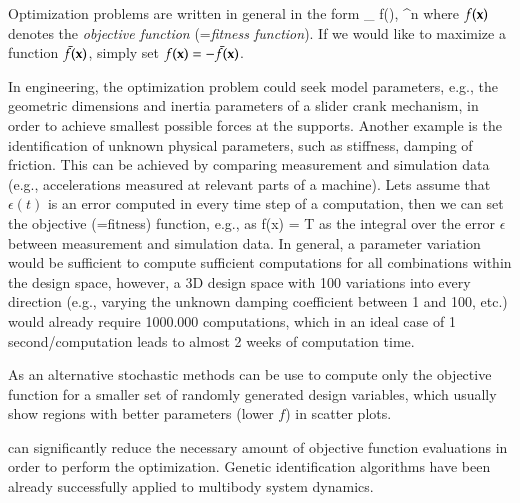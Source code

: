 Optimization problems are written in general in the form
\be
  \min\limits_{\xv} f(\xv), \quad \xv \in \Rcal^n \eqComma
\ee
where $f(\mathbf{x})$ denotes the {\it objective function} (={\it fitness function}). If we would like to maximize a function $\bar f(\mathbf{x})$, simply set $f(\mathbf{x})=-\bar f(\mathbf{x})$.

In engineering, the optimization problem could seek model parameters, e.g., the geometric dimensions and inertia parameters of a slider crank mechanism, in order to achieve smallest possible forces at the supports.
Another example is the identification of unknown physical parameters, such as stiffness, damping of friction. This can be achieved by comparing measurement and simulation data (e.g., accelerations measured at relevant parts of a machine). Lets assume that $\epsilon(t)$ is an error computed in every time step of a computation, then we can set the objective (=fitness) function, e.g., as 
\be
  f(x) =  T 
\ee
as the integral over the error $\epsilon$ between measurement and simulation data.
In general, a parameter variation would be sufficient to compute sufficient computations for all combinations within the design space, however, a 3D design space with 100 variations into every direction (e.g., varying the unknown damping coefficient between 1 and 100, etc.) would already require 1000.000 computations, which in an ideal case of 1 second/computation leads to almost 2 weeks of computation time.

As an alternative stochastic methods can be use to compute only the objective function for a smaller set of randomly generated design variables, which usually show regions with better parameters (lower $f$) in scatter plots.

\cite{Goldberg1989, Whitley1994} can significantly reduce the necessary amount of objective function evaluations in order to perform the optimization. Genetic identification algorithms have been already successfully applied to multibody system dynamics\cite{Eder2014}. 

